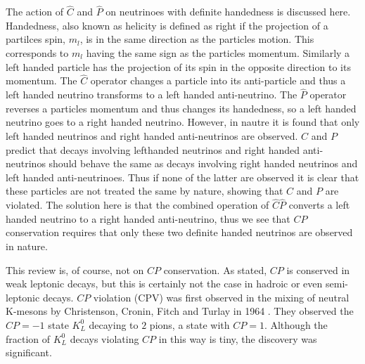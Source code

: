 \noindent The action of $\hat{C}$ and $\hat{P}$ on neutrinoes with definite handedness is discussed here. Handedness, also known as helicity is defined as right if the projection of a partilces spin, $m_{l}$, is in the same direction as the particles motion. This corresponds to $m_{l}$ having the same sign as the particles momentum. Similarly a left handed particle has the projection of its spin in the opposite direction to its momentum. The $\hat{C}$ operator changes a particle into its anti-particle and thus a left handed neutrino transforms to a left handed anti-neutrino. The $\hat{P}$ operator reverses a particles momentum and thus changes its handedness, so a left handed neutrino goes to a right handed neutrino. However, in nautre it is found that only left handed neutrinos and right handed anti-neutrinos are observed. $C$ and $P$ predict that decays involving lefthanded neutrinos and right handed anti-neutrinos should behave the same as decays involving right handed neutrinos and left handed anti-neutrinoes. Thus if none of the latter are observed it is clear that these particles are not treated the same by nature, showing that $C$ and $P$ are violated. The solution here is that the combined operation of $\hat{C}\hat{P}$ converts a left handed neutrino to a right handed anti-neutrino, thus we see that $CP$ conservation requires that only these two definite handed neutrinos are observed in nature.               

This review is, of course, not on $CP$ conservation. As stated, $CP$ is conserved in weak leptonic decays, but this is certainly not the case in hadroic or even semi-leptonic decays. $CP$ violation (CPV) was first observed in the mixing of neutral K-mesons by Christenson, Cronin, Fitch and Turlay in 1964 \cite{FirstCPV}. They observed the $CP = -1$ state $K^{0}_L$ decaying to $2$ pions, a state with $CP = 1$. Although the fraction of $K^{0}_L$ decays violating $CP$ in this way is tiny, the discovery was significant.      
